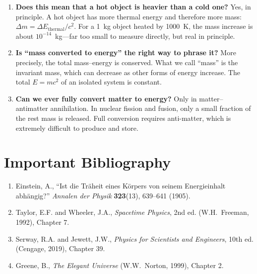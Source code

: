 \begin{enumerate}
\item \textbf{Does this mean that a hot object is heavier than a cold one?}
Yes, in principle. A hot object has more thermal energy and therefore more mass: $\Delta m = \Delta E_{\text{thermal}}/c^{2}$. For a 1~kg object heated by 1000~K, the mass increase is about $10^{-14}$~kg---far too small to measure directly, but real in principle.

\item \textbf{Is ``mass converted to energy'' the right way to phrase it?}
More precisely, the total mass--energy is conserved. What we call ``mass'' is the invariant mass, which can decrease as other forms of energy increase. The total $E = mc^{2}$ of an isolated system is constant.

\item \textbf{Can we ever fully convert matter to energy?}
Only in matter--antimatter annihilation. In nuclear fission and fusion, only a small fraction of the rest mass is released. Full conversion requires anti-matter, which is extremely difficult to produce and store.
\end{enumerate}
\section*{Important Bibliography}

\begin{enumerate}
\item Einstein, A., ``Ist die Tr\"aheit eines K\"orpers von seinem Energieinhalt abh\"angig?'' \textit{Annalen der Physik} \textbf{323}(13), 639--641 (1905).
\item Taylor, E.F. and Wheeler, J.A., \textit{Spacetime Physics}, 2nd ed. (W.H.\ Freeman, 1992), Chapter 7.
\item Serway, R.A. and Jewett, J.W., \textit{Physics for Scientists and Engineers}, 10th ed. (Cengage, 2019), Chapter 39.
\item Greene, B., \textit{The Elegant Universe} (W.W.\ Norton, 1999), Chapter 2.
\end{enumerate}

